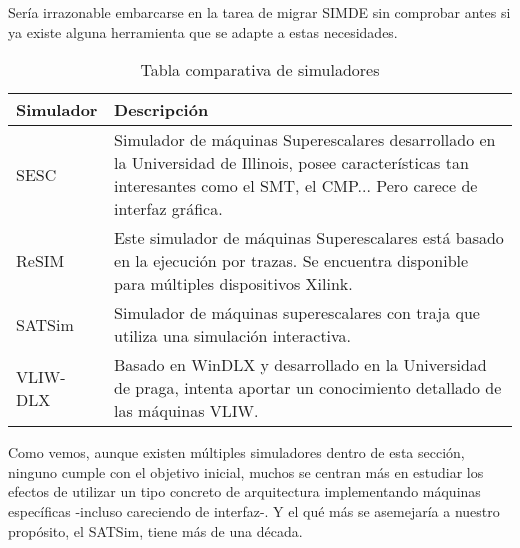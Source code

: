 Sería irrazonable embarcarse en la tarea de migrar SIMDE sin comprobar antes si ya existe alguna
herramienta que se adapte a estas necesidades.

\begin{table}[ht]
\begin{center}
    \begin{tabular}{| l | p{12cm} |}
    \hline
    Simulador & Descripción \\ \hline
    SESC \cite{SESC} & Simulador de máquinas Superescalares desarrollado en la Universidad de Illinois, posee
    características tan interesantes como el SMT, el CMP... Pero carece de interfaz gráfica. \\ \hline
    ReSIM \cite{ReSIM} & Este simulador de máquinas Superescalares está basado en la ejecución por trazas. Se encuentra 
    disponible para múltiples dispositivos Xilink. \\ \hline
    SATSim \cite{SATSim} & Simulador de máquinas superescalares con traja que utiliza una simulación interactiva. \\ \hline
    VLIW-DLX \cite{VLIWDLX} & Basado en WinDLX y desarrollado en la Universidad de praga, intenta aportar un conocimiento 
    detallado de las máquinas VLIW. \\ \hline
    \end{tabular}
    \caption{Tabla comparativa de simuladores}
\end{center}
\end{table}

Como vemos, aunque existen múltiples simuladores dentro de esta sección, 
ninguno cumple con el objetivo inicial, muchos se centran más en estudiar los
efectos de utilizar un tipo concreto de arquitectura implementando máquinas 
específicas -incluso careciendo de interfaz-. Y el qué más se asemejaría a nuestro
propósito, el SATSim, tiene más de una década.